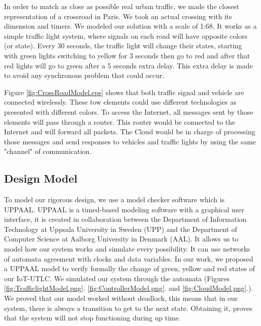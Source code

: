 In order to match as close as possible real urban traffic,
	we made the closest representation of a crossroad in Paris.
We took an actual crossing with its dimension and timers.
We modeled our solution with a scale of 1:68.
It works as a simple traffic light system,
	where signals on each road will have opposite colors (or state).
Every 30 seconds,
	the traffic light will change their states,
	starting with green lights switching to yellow for 3 seconds then go to red and after that red lights will go to green after a 5 seconds extra delay.
This extra delay is made to avoid any synchronous problem that could occur.

Figure \ref{fig:CrossRoadModel.eps} shows that both traffic signal and vehicle are connected wirelessly.
These tow elements could use different technologies as presented with different colors.
To access the Internet,
	all messages sent by those elements will pass through a router.
This router would be connected to the Internet and will forward all packets.
The Cloud would be in charge of processing those messages and send responses to vehicles and traffic lights by using the same "channel" of communication.

\subsection{Design Model}

To model our rigorous design,
	we use a model checker software which is UPPAAL.
UPPAAL is a timed-based modeling software with a graphical user interface,
	it is created in collaboration between the Department of Information Technology at Uppsala University in Sweden (UPP)  and the Department of Computer Science at Aalborg University in Denmark (AAL).
It allows us to model how our system works and simulate every possibility.
It can use networks of automata agreement with clocks and data variables.
In our work,
	we proposed a UPPAAL \cite{david_uppaal_2015} model to verify formally the change of green,
	yellow and red states of our IoT-UTLC.
We simulated our system through the automata (Figures \ref{fig:TrafficlightModel.png}.
\ref{fig:ControllerModel.png}.
and \ref{fig:CloudModel.png}.).
We proved that our model worked without deadlock,
	this means that in our system,
	there is always a transition to get to the next state.
Obtaining it,
	proves that the system will not stop functioning during up time.

